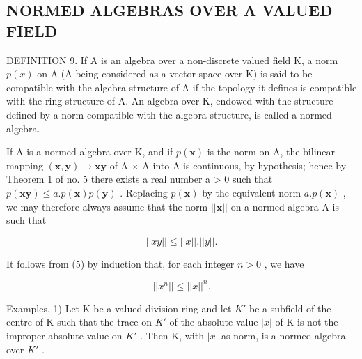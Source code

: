 \subsection{NORMED ALGEBRAS OVER A VALUED FIELD}

DEFINITION 9. If A is an algebra over a non-discrete valued field K, a norm \(p(x)\) on A (A being considered as a vector space over K) is said to be compatible with the algebra structure of A if the topology it defines is compatible with the ring structure of A. An algebra over K, endowed with the structure defined by a norm compatible with the algebra structure, is called a normed algebra.

If A is a normed algebra over K, and if \(p(\boldsymbol{x})\) is the norm on A, the bilinear mapping \((\boldsymbol{x}, \boldsymbol{y}) \to \boldsymbol{x}\boldsymbol{y}\) of A × A into A is continuous, by hypothesis; hence by Theorem 1 of no. 5 there exists a real number a \textgreater{} 0 such that \(p(\boldsymbol{x}\boldsymbol{y}) \leqslant a.p(\boldsymbol{x})p(\boldsymbol{y})\) . Replacing \(p(\boldsymbol{x})\) by the equivalent norm \(a.p(\boldsymbol{x})\) , we may therefore always assume that the norm \(||\boldsymbol{x}||\) on a normed algebra A is such that

\[
\left| \left| x y \right| \right| \leqslant \left| \left| x \right| \right|. \left| \left| y \right| \right|.\tag{5}
\]

It follows from (5) by induction that, for each integer \(n > 0\) , we have

\[
\left| \left| x ^ {n} \right| \right| \leqslant \left| \left| x \right| \right| ^ {n}.\tag{6}
\]

Examples. 1) Let K be a valued division ring and let \(K'\) be a subfield of the centre of K such that the trace on \(K'\) of the absolute value \(|x|\) of K is not the improper absolute value on \(K'\) . Then K, with \(|x|\) as norm, is a normed algebra over \(K'\) .

